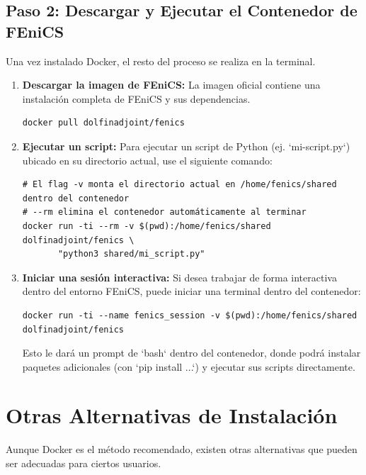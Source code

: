 \subsection{Paso 2: Descargar y Ejecutar el Contenedor de FEniCS}
Una vez instalado Docker, el resto del proceso se realiza en la terminal.
\begin{enumerate}
    \item \textbf{Descargar la imagen de FEniCS:} La imagen oficial contiene una instalación completa de FEniCS y sus dependencias.
    \begin{verbatim}
docker pull dolfinadjoint/fenics
    \end{verbatim}
    \item \textbf{Ejecutar un script:} Para ejecutar un script de Python (ej. `mi-script.py`) ubicado en su directorio actual, use el siguiente comando:
    \begin{verbatim}
# El flag -v monta el directorio actual en /home/fenics/shared dentro del contenedor
# --rm elimina el contenedor automáticamente al terminar
docker run -ti --rm -v $(pwd):/home/fenics/shared dolfinadjoint/fenics \
       "python3 shared/mi_script.py"
    \end{verbatim}
    \item \textbf{Iniciar una sesión interactiva:} Si desea trabajar de forma interactiva dentro del entorno FEniCS, puede iniciar una terminal dentro del contenedor:
    \begin{verbatim}
docker run -ti --name fenics_session -v $(pwd):/home/fenics/shared dolfinadjoint/fenics
    \end{verbatim}
    Esto le dará un prompt de `bash` dentro del contenedor, donde podrá instalar paquetes adicionales (con `pip install ...`) y ejecutar sus scripts directamente.
\end{enumerate}

\section{Otras Alternativas de Instalación}
Aunque Docker es el método recomendado, existen otras alternativas que pueden ser adecuadas para ciertos usuarios.


